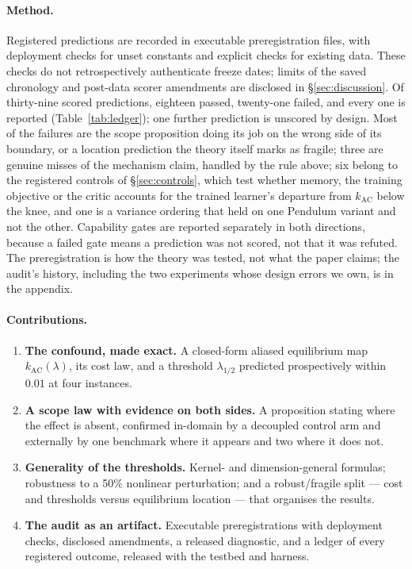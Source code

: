 \paragraph{Method.} Registered predictions are recorded in executable
preregistration files, with deployment checks for unset constants and explicit
checks for existing data. These checks do not retrospectively authenticate
freeze dates; limits of the saved chronology and post-data scorer amendments
are disclosed in \S\ref{sec:discussion}.
Of thirty-nine scored predictions, eighteen passed, twenty-one failed, and
every one is reported (Table~\ref{tab:ledger}); one further prediction is
unscored by design. Most of the failures are the
scope proposition doing its job on the wrong side of its boundary, or a
location prediction the theory itself marks as fragile; three are genuine
misses of the mechanism claim, handled by the rule above; six belong to the
registered controls of \S\ref{sec:controls}, which test whether memory, the
training objective or the critic accounts for the trained learner's departure
from $k_{\mathrm{AC}}$ below the knee, and one is a variance ordering that
held on one Pendulum variant and not the other. Capability gates are
reported separately in both directions, because a failed gate means a
prediction was not scored, not that it was refuted. The preregistration is
how the theory was tested, not what the paper claims; the audit's history,
including the two experiments whose design errors we own, is in the appendix.

\paragraph{Contributions.}
\begin{enumerate}[leftmargin=*,itemsep=1pt,topsep=2pt]
\item \textbf{The confound, made exact.} A closed-form aliased equilibrium
  map $k_{\mathrm{AC}}(\lambda)$, its cost law, and a threshold
  $\lambda_{1/2}$ predicted prospectively within $0.01$ at four instances.
\item \textbf{A scope law with evidence on both sides.} A proposition stating
  where the effect is absent, confirmed in-domain by a decoupled control arm
  and externally by one benchmark where it appears and two where it does not.
\item \textbf{Generality of the thresholds.} Kernel- and dimension-general
  formulas; robustness to a 50\% nonlinear perturbation; and a robust/fragile
  split --- cost and thresholds versus equilibrium location --- that
  organises the results.
\item \textbf{The audit as an artifact.} Executable preregistrations with
  deployment checks, disclosed amendments, a released diagnostic, and a
  ledger of every registered outcome, released with the testbed and harness.
\end{enumerate}

